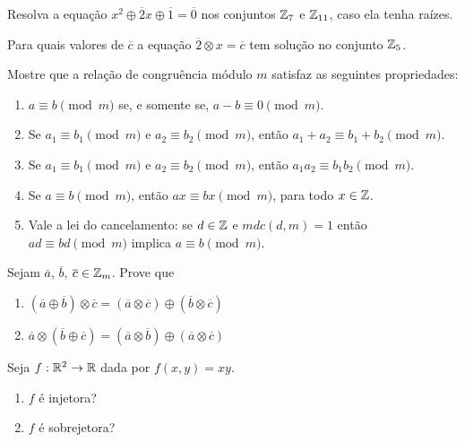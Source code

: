 \documentclass[12pt]{exam}
\begin{document}
    \vspace{.3cm}

    \questao{} Resolva a equação $x^2 \oplus \overline{2}x \oplus \overline{1} = \overline{0}$ nos conjuntos $\mathbb{Z}_7$ e $\mathbb{Z}_{11}$, caso ela tenha raízes.

    \vspace{.3cm}

    \questao{} Para quais valores de $\overline{c}$ a equação $\overline{2}\otimes x = \overline{c}$ tem solução no conjunto $\mathbb{Z}_5$.

    \vspace{.3cm}

    \questao{} Mostre que a relação de congruência módulo $m$ satisfaz as seguintes propriedades:
    \begin{enumerate}[label=({\alph*})]
      \item $a\equiv b\pmod{m}$ se, e somente se, $a - b\equiv 0\pmod{m}$.
      \item Se $a_{1}\equiv b_{1}\pmod{m}$ e $a_{2}\equiv b_{2}\pmod{m}$, então $a_{1}+a_{2}\equiv b_{1}+b_{2}\pmod{m}$.
      \item Se $a_{1}\equiv b_{1}\pmod{m}$ e $a_{2}\equiv b_{2}\pmod{m}$, então $a_{1}a_{2}\equiv b_{1}b_{2}\pmod{m}$.\label{item_provado}
      \item Se $a\equiv b\pmod{m}$, então $ax\equiv bx\pmod{m}$, para todo $x \in \mathbb{Z}$.
      \item Vale a lei do cancelamento: se $d \in \mathbb{Z}$ e $mdc(d,m) = 1$ então $ad \equiv bd \pmod{m}$ implica $a\equiv b \pmod{m}$.
    \end{enumerate}

    \vspace{.3cm}

    \questao{} Sejam $\overline{a}$, $\overline{b}$, $\overline{c} \in \mathbb{Z}_m$. Prove que
    \begin{enumerate}[label=({\alph*})]
        \item $(\overline{a} \oplus \overline{b}) \otimes \overline{c} = (\overline{a} \otimes \overline{c}) \oplus (\overline{b} \otimes \overline{c})$

        \item $\overline{a} \otimes (\overline{b} \oplus \overline{c}) = (\overline{a} \otimes \overline{b}) \oplus (\overline{a} \otimes \overline{c})$
    \end{enumerate}

    \vspace{.3cm}

    \questao{} Seja $f: \mathbb{R}^2 \to \mathbb{R}$ dada por $f(x,y) = xy$.
    \begin{enumerate}[label={\alph*})]
        \item $f$ é injetora?

        \item $f$ é sobrejetora?
    \end{enumerate}
\end{document}
